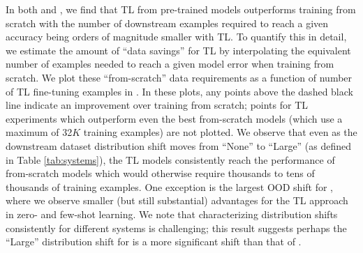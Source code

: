 In both \sysA{} and \sysB{}, we find that TL from pre-trained models outperforms training from scratch with the number of downstream examples required to reach a given accuracy being orders of magnitude smaller with TL. To quantify this in detail, we estimate the amount of ``data savings'' for TL by interpolating the equivalent number of examples needed to reach a given model error when training from scratch. We plot these ``from-scratch'' data requirements as a function of number of TL fine-tuning examples in .
In these plots, any points above the dashed black line indicate an improvement over training from scratch; points for  TL experiments which outperform even the best from-scratch models (which use a maximum of 32$K$ training examples) are not plotted. We observe that even as the downstream dataset distribution shift moves from ``None'' to ``Large'' (as defined in Table \ref{tab:systems}), the TL models consistently reach the performance of from-scratch models which would otherwise require thousands to tens of thousands of training examples. One  exception is the largest OOD shift for \sysA{}, where we observe smaller (but still substantial) advantages for the TL approach in zero- and few-shot learning. We note that characterizing distribution shifts consistently for different systems is challenging; this result suggests perhaps the ``Large'' distribution shift for \sysA{} is a more significant shift than that of \sysB{}.



